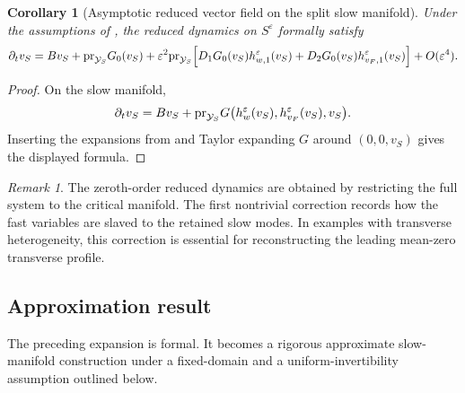 \documentclass[11pt]{article}
\newtheorem{corollary}[theorem]{Corollary}
\theoremstyle{definition}
\theoremstyle{remark}
\newtheorem{remark}[theorem]{Remark}
\numberwithin{equation}{section}
\newcommand{\mc}[1]{\mathcal{#1}}
\newcommand{\pr}{\textnormal{pr}}
\begin{document}
\begin{corollary}[Asymptotic reduced vector field on the split slow manifold]\label{cor: formal reduced field}
Under the assumptions of ,  the reduced dynamics on
\(S^\varepsilon\) formally satisfy
\begin{equation}
\label{eq:asymp-slow-dynamics-corrected}
\partial_t v_S
=
Bv_S
+
\pr_{\mc Y_S}G_0(v_S)
+
\varepsilon^2
\pr_{\mc Y_S}
\Big[
D_1G_0(v_S)h_{w,1}^\varepsilon(v_S)
+
D_2G_0(v_S)h_{v_F,1}^\varepsilon(v_S)
\Big]
+
O(\varepsilon^4).
\end{equation}
\end{corollary}

\begin{proof}
On the slow manifold,
\[
\partial_t v_S
=
Bv_S
+
\pr_{\mc Y_S}
G\bigl(
h_w^\varepsilon(v_S),
h_{v_F}^\varepsilon(v_S),
v_S
\bigr).
\]
Inserting the expansions from  and Taylor expanding
\(G\) around \((0,0,v_S)\) gives the displayed formula.
\end{proof}

\begin{remark}
The zeroth-order reduced dynamics are obtained by restricting the full system
to the critical manifold. The first nontrivial correction records how the fast
variables are slaved to the retained slow modes. In examples with transverse
heterogeneity, this correction is essential for reconstructing the leading
mean-zero transverse profile.
\end{remark}

\subsection{Approximation result}

The preceding expansion is formal. 
It becomes a rigorous approximate slow-manifold construction under a fixed-domain and a uniform-invertibility assumption outlined below.
\end{document}
